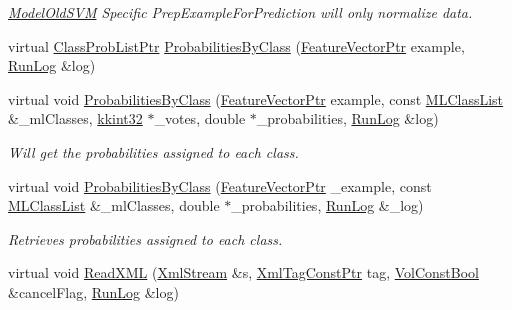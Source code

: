 \begin{DoxyCompactItemize}
\begin{DoxyCompactList}\small\item\em \hyperlink{class_k_k_m_l_l_1_1_model_old_s_v_m}{Model\+Old\+S\+VM} Specific \textquotesingle{}Prep\+Example\+For\+Prediction\textquotesingle{} will only normalize data. \end{DoxyCompactList}\item 
virtual \hyperlink{namespace_k_k_m_l_l_a60f96a524ddb189eff2b4391cf0b651c}{Class\+Prob\+List\+Ptr} \hyperlink{class_k_k_m_l_l_1_1_model_old_s_v_m_ae0b70394f1463488bd4cde326624a40d}{Probabilities\+By\+Class} (\hyperlink{namespace_k_k_m_l_l_a0c5df3d48f45926fbc4fee04f5e3bc04}{Feature\+Vector\+Ptr} example, \hyperlink{class_k_k_b_1_1_run_log}{Run\+Log} \&log)
\item 
virtual void \hyperlink{class_k_k_m_l_l_1_1_model_old_s_v_m_a2d4baff9d3f232cebc85bb2b139769c7}{Probabilities\+By\+Class} (\hyperlink{namespace_k_k_m_l_l_a0c5df3d48f45926fbc4fee04f5e3bc04}{Feature\+Vector\+Ptr} example, const \hyperlink{class_k_k_m_l_l_1_1_m_l_class_list}{M\+L\+Class\+List} \&\+\_\+ml\+Classes, \hyperlink{namespace_k_k_b_a8fa4952cc84fda1de4bec1fbdd8d5b1b}{kkint32} $\ast$\+\_\+votes, double $\ast$\+\_\+probabilities, \hyperlink{class_k_k_b_1_1_run_log}{Run\+Log} \&log)
\begin{DoxyCompactList}\small\item\em Will get the probabilities assigned to each class. \end{DoxyCompactList}\item 
virtual void \hyperlink{class_k_k_m_l_l_1_1_model_old_s_v_m_a7f79c44cb8cf82bcb559bd7b3064016d}{Probabilities\+By\+Class} (\hyperlink{namespace_k_k_m_l_l_a0c5df3d48f45926fbc4fee04f5e3bc04}{Feature\+Vector\+Ptr} \+\_\+example, const \hyperlink{class_k_k_m_l_l_1_1_m_l_class_list}{M\+L\+Class\+List} \&\+\_\+ml\+Classes, double $\ast$\+\_\+probabilities, \hyperlink{class_k_k_b_1_1_run_log}{Run\+Log} \&\+\_\+log)
\begin{DoxyCompactList}\small\item\em Retrieves probabilities assigned to each class. \end{DoxyCompactList}\item 
virtual void \hyperlink{class_k_k_m_l_l_1_1_model_old_s_v_m_aae946586f3f82596971847e40301fb5a}{Read\+X\+ML} (\hyperlink{class_k_k_b_1_1_xml_stream}{Xml\+Stream} \&s, \hyperlink{namespace_k_k_b_a5f1b0b1667d79fec26deeff10c43df23}{Xml\+Tag\+Const\+Ptr} tag, \hyperlink{namespace_k_k_b_a7d390f568e2831fb76b86b56c87bf92f}{Vol\+Const\+Bool} \&cancel\+Flag, \hyperlink{class_k_k_b_1_1_run_log}{Run\+Log} \&log)

\end{DoxyCompactItemize}
